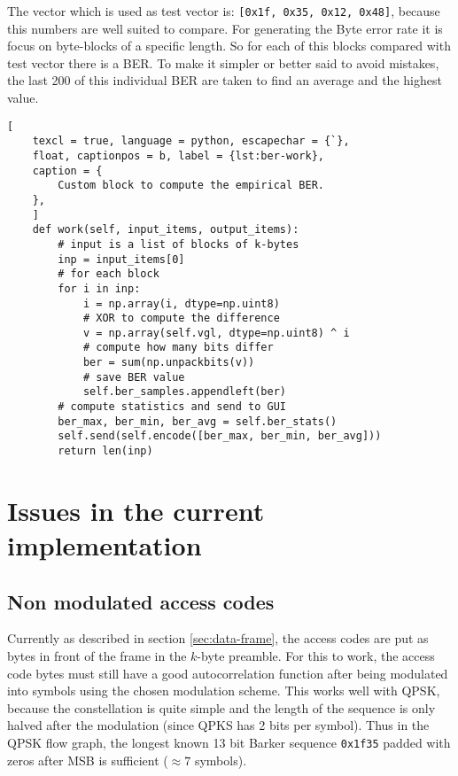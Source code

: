 The vector which is used as test vector is: \texttt{[0x1f, 0x35, 0x12, 0x48]}, because this numbers are well suited to compare.
For generating the Byte error rate it is focus on byte-blocks of a specific length. So for each of this blocks compared with test vector there is a BER. To make it simpler or better said to avoid mistakes, the last 200 of this individual BER are taken to find an average and the highest value. 



\begin{lstlisting}[
	texcl = true, language = python, escapechar = {`},
	float, captionpos = b, label = {lst:ber-work},
	caption = {
		Custom block to compute the empirical BER.
	},
	]
	def work(self, input_items, output_items):
		# input is a list of blocks of k-bytes
		inp = input_items[0]
		# for each block
		for i in inp:
			i = np.array(i, dtype=np.uint8)
			# XOR to compute the difference
			v = np.array(self.vgl, dtype=np.uint8) ^ i
			# compute how many bits differ
			ber = sum(np.unpackbits(v))
			# save BER value
			self.ber_samples.appendleft(ber)
		# compute statistics and send to GUI
		ber_max, ber_min, ber_avg = self.ber_stats()
		self.send(self.encode([ber_max, ber_min, ber_avg]))
		return len(inp)
\end{lstlisting}

\section{Issues in the current implementation}

\subsection{Non modulated access codes}

Currently as described in section \ref{sec:data-frame}, the access codes are put as bytes in front of the frame in the \(k\)-byte preamble. For this to work, the access code bytes must still have a good autocorrelation function after being modulated into symbols using the chosen modulation scheme. This works well with QPSK, because the constellation is quite simple and the length of the sequence is only halved after the modulation (since QPKS has 2 bits per symbol). Thus in the QPSK flow graph, the longest known 13 bit Barker sequence \texttt{0x1f35} padded with zeros after MSB is sufficient (\(\approx 7\) symbols).


